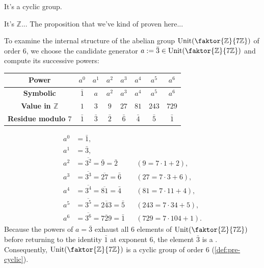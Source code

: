 \begin{student}
It's a cyclic group.
\end{student}

\begin{speech}[00:39:48 - 00:39:54]
It's $\mathbb{Z}$... The proposition that we've kind of proven here...
\end{speech}

\begin{content}[Powers of the Generator \texorpdfstring{$a = \bar{3}$}{a = 3} in \texorpdfstring{$\operatorname{Unit}(\faktor{\mathbb{Z}}{7\mathbb{Z}})$}{U(Z/7Z)}]
To examine the internal structure of the abelian group $\operatorname{Unit}(\faktor{\mathbb{Z}}{7\mathbb{Z}})$ of order $6$, we choose the candidate generator $a := \bar{3} \in \operatorname{Unit}(\faktor{\mathbb{Z}}{7\mathbb{Z}})$ and compute its successive powers:

\begin{center}
\begin{tabular}{c|ccccccc}
\toprule
\textbf{Power} & $a^0$ & $a^1$ & $a^2$ & $a^3$ & $a^4$ & $a^5$ & $a^6$ \\
\midrule
\textbf{Symbolic} & $\bar{1}$ & $a$ & $a^2$ & $a^3$ & $a^4$ & $a^5$ & $a^6$ \\
\textbf{Value in $\mathbb{Z}$} & $1$ & $3$ & $9$ & $27$ & $81$ & $243$ & $729$ \\
\textbf{Residue modulo $7$} & $\bar{1}$ & $\bar{3}$ & $\bar{2}$ & $\bar{6}$ & $\bar{4}$ & $\bar{5}$ & $\bar{1}$ \\
\bottomrule
\end{tabular}
\end{center}

\begin{steps}
\begin{align*}
    a^0 &= \bar{1}, \\
    a^1 &= \bar{3}, \\
    a^2 &= \overline{3^2} = \bar{9} = \bar{2} && (9 = 7 \cdot 1 + 2), \\
    a^3 &= \overline{3^3} = \overline{27} = \bar{6} && (27 = 7 \cdot 3 + 6), \\
    a^4 &= \overline{3^4} = \overline{81} = \bar{4} && (81 = 7 \cdot 11 + 4), \\
    a^5 &= \overline{3^5} = \overline{243} = \bar{5} && (243 = 7 \cdot 34 + 5), \\
    a^6 &= \overline{3^6} = \overline{729} = \bar{1} && (729 = 7 \cdot 104 + 1).
\end{align*}
Because the powers of $a = \bar{3}$ exhaust all $6$ elements of $\operatorname{Unit}(\faktor{\mathbb{Z}}{7\mathbb{Z}})$ before returning to the identity $\bar{1}$ at exponent $6$, the element $\bar{3}$ is a . Consequently, $\operatorname{Unit}(\faktor{\mathbb{Z}}{7\mathbb{Z}})$ is a cyclic group of order $6$ (\cref{def:pre-cyclic}).
\end{steps}
\end{content}

